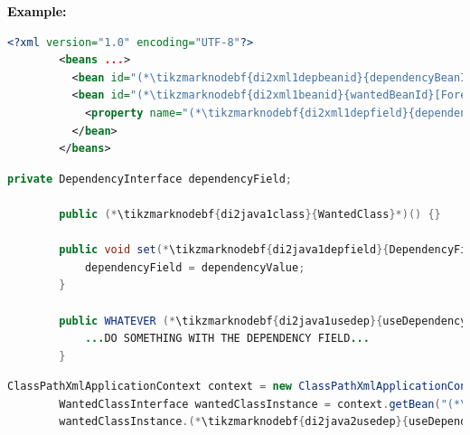 \documentclass[12pt, dvipsnames, oneside, a4paper, titlepage, usenames]{report}
\newcommand{\highlight}[2]{\vspace{\baselineskip}\noindent\textcolor{#2}{\textbf{#1}}}
\newcommand{\example}{\highlight{Example: }{black}}
\begin{document}
    \enlargethispage{1cm}
    \example
    \begin{lstlisting}[language=XML, title={Configuration XML}]
        <?xml version="1.0" encoding="UTF-8"?>
        <beans ...>
          <bean id="(*\tikzmarknodebf{di2xml1depbeanid}{dependencyBeanId}[ForestGreen]*)" class="package.subfolder.DependencyClass"/>
          <bean id="(*\tikzmarknodebf{di2xml1beanid}{wantedBeanId}[ForestGreen]*)" class="package.subfolder.(*\tikzmarknodebf{di2xml1class}{WantedClass}[ForestGreen]*)">
            <property name="(*\tikzmarknodebf{di2xml1depfield}{dependencyField}[ForestGreen]*)" ref="(*\tikzmarknodebf{di2xml1depbeanid2}{dependencyBeanId}[ForestGreen]*)"/>
          </bean>
        </beans>
    \end{lstlisting}
    \begin{lstlisting}[language=Java, title={Wanted class with the zero--parameter constructor and the setter method}]
        private DependencyInterface dependencyField;

        public (*\tikzmarknodebf{di2java1class}{WantedClass}*)() {}

        public void set(*\tikzmarknodebf{di2java1depfield}{DependencyField}*)(DependencyInterface dependencyValue) {
            dependencyField = dependencyValue;
        }

        public WHATEVER (*\tikzmarknodebf{di2java1usedep}{useDependency}*)() {
            ...DO SOMETHING WITH THE DEPENDENCY FIELD...
        }
    \end{lstlisting}
    \begin{lstlisting}[language=Java, title={Usage}]
        ClassPathXmlApplicationContext context = new ClassPathXmlApplicationContext("configurationFile.xml");
        WantedClassInterface wantedClassInstance = context.getBean("(*\tikzmarknodebf{di2java2beanid}{wantedBeanId}[ForestGreen]*)", WantedClassInterface.class);
        wantedClassInstance.(*\tikzmarknodebf{di2java2usedep}{useDependency}[ForestGreen]*)();
    \end{lstlisting}
\end{document}
